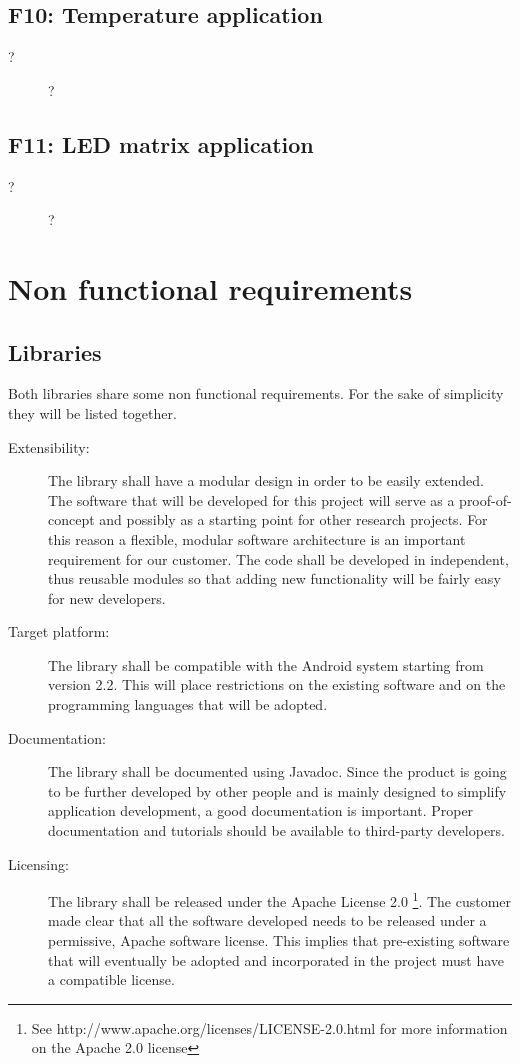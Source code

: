 \subsection{F10: Temperature application}
\begin{description}
	\item[?] ?
\end{description}

\subsection{F11: LED matrix application}
\begin{description}
	\item[?] ?
\end{description}

\newpage

\section{Non functional requirements}

\subsection{Libraries}

Both libraries share some non functional requirements.
For the sake of simplicity they will be listed together.

\begin{description}
	\item[Extensibility:] The library shall have a modular design
	in order to be easily extended. The software that will be developed for
	this project will serve as a proof-of-concept and possibly as a starting
	point for other research projects. For this reason a flexible, modular
	software architecture is an important requirement for our customer. The code
	shall be developed in independent, thus reusable modules so that adding new
	functionality will be fairly easy for new developers.
	\item[Target platform:] The library shall be compatible with the Android
	system starting from version 2.2. This will place restrictions on the
	existing software and on the programming languages that will be adopted.
	\item[Documentation:] The library shall be documented using Javadoc.
	Since the product is going to be further developed by other people and is
	mainly designed to simplify application development, a good documentation is
	important. Proper documentation and tutorials should be available to
	third-party developers.
	\item[Licensing:] The library shall be released under the Apache License 2.0
	\footnote{See http://www.apache.org/licenses/LICENSE-2.0.html for more
	information on the Apache 2.0 license}. The customer made clear that all the
	software developed needs to be released under a permissive, Apache software
	license. This implies that pre-existing software that will eventually be
	adopted and incorporated in the project must have a compatible license.
\end{description}


